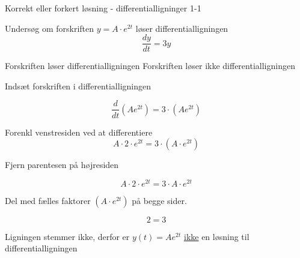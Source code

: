 \documentclass{article}
\begin{document}
\tableofcontents
\newpage

\begin{exercise}{Korrekt eller forkert løsning - differentialligninger 1-1}


Undersøg om forskriften $y = A \cdot e^{2t}$ løser differentialligningen
\[
\frac{dy}{dt} = 3y
\]

\begin{multichoice}
\itemfalse Forskriften løser differentialligningen 
\itemtrue Forskriften løser ikke differentialligningen 
\end{multichoice}

\hint

Indsæt forskriften i differentialligningen

\hint
\[
\frac{d}{dt} \left( A e^{2t}\right) = 3 \cdot \left( A e^{2t} \right)
\]


\hint

Forenkl venstresiden ved at differentiere
\[
A \cdot 2 \cdot e^{2t} = 3 \cdot \left(A \cdot e^{2t} \right)
\]

\hint

Fjern parentesen på højresiden

\hint
\[
A \cdot 2 \cdot e^{2t} = 3 \cdot A \cdot e^{2t}
\]

\hint
Del med fælles faktorer $\left( A \cdot e^{2t} \right)$ på begge sider.

\hint

\[
2 = 3
\]


\hint

Ligningen stemmer ikke, derfor er $y(t) = A e^{2t}$ \underline{ikke} en løsning til differentialligningen

\end{exercise}

\newpage
\end{document}
